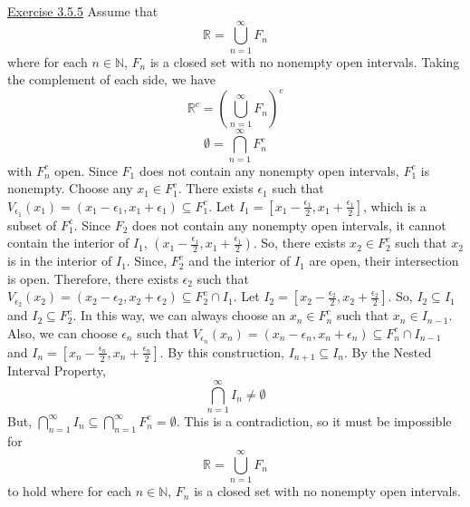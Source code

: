 \documentclass{exam}
\begin{document}
\underline{Exercise 3.5.5}
\newline
\newline
Assume that
\[\mathbb{R}=\bigcup_{n=1}^\infty F_n\]
where for each $n\in \mathbb{N}$, $F_n$ is a closed set with no nonempty open intervals. Taking the complement of each side, we have
\[\mathbb{R}^c=(\bigcup_{n=1}^\infty F_n)^c\]
\[\emptyset=\bigcap_{n=1}^\infty F_n^c\]
with $F_n^c$ open. Since $F_1$ does not contain any nonempty open intervals, $F_1^c$ is nonempty. Choose any $x_1\in F_1^c$. There exists $\epsilon_1$ such that $V_{\epsilon_1}(x_1)=(x_1-\epsilon_1,x_1+\epsilon_1)\subseteq F_1^c$. Let $I_1=[x_1-\frac{\epsilon_1}{2},x_1+\frac{\epsilon_1}{2}]$, which is a subset of $F_1^c$. Since $F_2$ does not contain any nonempty open intervals, it cannot contain the interior of $I_1$, $(x_1-\frac{\epsilon_1}{2},x_1+\frac{\epsilon_1}{2})$. So, there exists $x_2\in F_2^c$ such that $x_2$ is in the interior of $I_1$. Since, $F_2^c$ and the interior of $I_1$ are open, their intersection is open. Therefore, there exists $\epsilon_2$ such that $V_{\epsilon_2}(x_2)=(x_2-\epsilon_2,x_2+\epsilon_2)\subseteq F_2^c\cap I_1$. Let $I_2=[x_2-\frac{\epsilon_2}{2},x_2+\frac{\epsilon_2}{2}]$. So, $I_2\subseteq I_1$ and $I_2\subseteq F_2^c$. In this way, we can always choose an $x_n\in F_n^c$ such that $x_n\in I_{n-1}$. Also, we can choose $\epsilon_n$ such that $V_{\epsilon_n}(x_n)=(x_n-\epsilon_n,x_n+\epsilon_n)\subseteq F_n^c\cap I_{n-1}$ and $I_n=[x_n-\frac{\epsilon_n}{2},x_n+\frac{\epsilon_n}{2}]$. By this construction, $I_{n+1}\subseteq I_n$. By the Nested Interval Property,
\[\bigcap_{n=1}^\infty I_n\ne\emptyset\]
But, $\bigcap_{n=1}^\infty I_n\subseteq\bigcap_{n=1}^\infty F_n^c=\emptyset$. This is a contradiction, so it must be impossible for
\[\mathbb{R}=\bigcup_{n=1}^\infty F_n\]
to hold where for each $n\in \mathbb{N}$, $F_n$ is a closed set with no nonempty open intervals.
\newline
\end{document}
